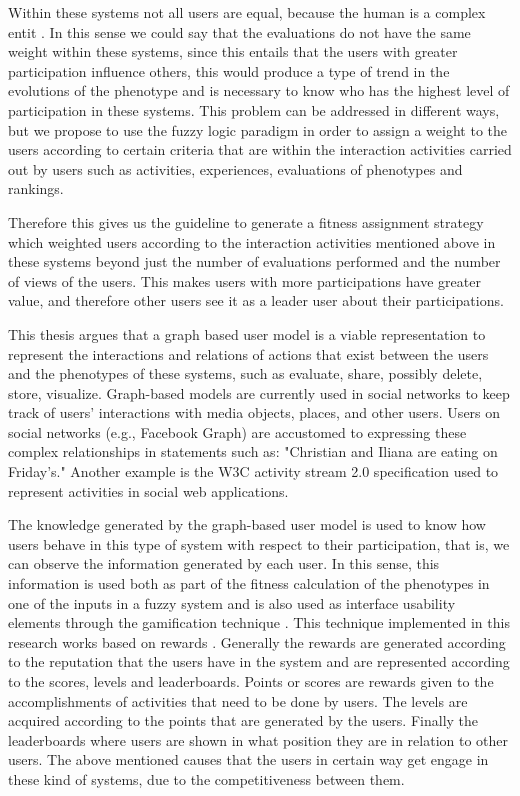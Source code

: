 \par Within these systems not all users are equal, because the human is a complex
entit \cite{}. In this sense we could say that the evaluations do not have the
same weight within these systems, since this entails that the users with greater
participation influence others, this would produce a type of trend in the
evolutions of the phenotype and is necessary to know who has the highest level
of participation in these systems. This problem can be addressed in different
ways, but we propose to use the fuzzy logic paradigm \cite{}\cite{}\cite{}in
order to assign a weight to the users according to certain criteria that are
within the interaction activities carried out by users such as activities,
experiences, evaluations of phenotypes and rankings.

\par Therefore this gives us the guideline to generate a fitness assignment
strategy which weighted users according to the interaction activities mentioned
above in these systems beyond just the number of evaluations performed and the
number of views of the users. This makes users with more participations have
greater value, and therefore other users see it as a leader user about their
participations.

\par This thesis argues that a graph based user model \cite{}is a viable
representation to represent the interactions and relations of actions that exist
between the users and the phenotypes of these systems, such as evaluate, share,
possibly delete, store, visualize. Graph-based models are currently used in
social networks to keep track of users' interactions with media objects, places,
and other users. Users on social networks (e.g., Facebook Graph) are accustomed
to expressing these complex relationships in statements such as: "Christian and
Iliana are eating on Friday's." Another example is the W3C activity stream 2.0
specification used to represent activities in social web applications.

\par The knowledge generated by the graph-based user model is used to know how
users behave in this type of system with respect to their participation, that
is, we can observe the information generated by each user. In this sense, this
information is used both as part of the fitness calculation of the phenotypes in
one of the inputs in a fuzzy system and is also used as interface usability
elements through the gamification technique \cite{}\cite{}\cite{}\cite{}. This
technique implemented in this research works based on rewards \cite{}. Generally
the rewards are generated according to the reputation that the users have in the
system and are represented according to the scores, levels and leaderboards.
Points or scores are rewards given to the accomplishments of activities that
need to be done by users. The levels are acquired according to the points that
are generated by the users. Finally the leaderboards where users are shown in
what position they are in relation to other users. The above mentioned causes
that the users in certain way get engage in these kind of systems, due to the
competitiveness between them.

